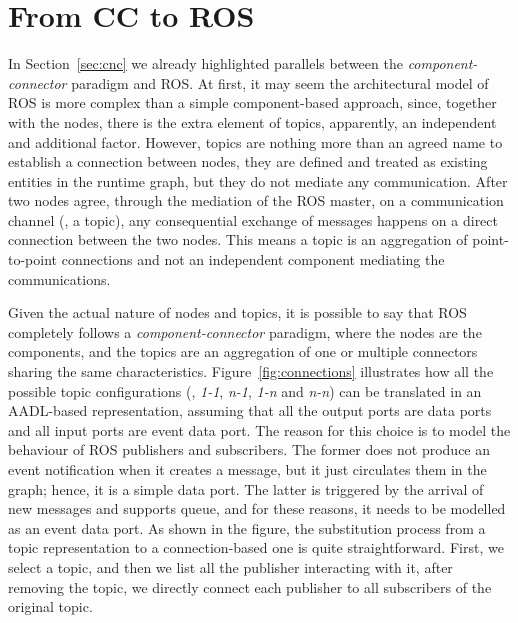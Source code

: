 \section{From CC to ROS}
\label{sec:cnc-ros}
In Section~\ref{sec:cnc} we already highlighted parallels between the \textit{com\-po\-nent-connector} paradigm and ROS. At first, it may seem the architectural model of ROS is more complex than a simple component-based approach, since, together with the nodes, there is the extra element of topics, apparently, an independent and additional factor. However, topics are nothing more than an agreed name to establish a connection between nodes, they are defined and treated as existing entities in the runtime graph, but they do not mediate any communication. After two nodes agree, through the mediation of the ROS master, on a communication channel (\ie, a topic), any consequential exchange of messages happens on a direct connection between the two nodes. This means a topic is an aggregation of point-to-point connections and not an independent component mediating the communications. 

Given the actual nature of nodes and topics, it is possible to say that ROS completely follows a \textit{component-connector} paradigm, where the nodes are the components, and the topics are an aggregation of one or multiple connectors sharing the same characteristics. Figure~\ref{fig:connections} illustrates how all the possible topic configurations (\ie, \textit{1-1}, \textit{n-1}, \textit{1-n} and \textit{n-n}) can be translated in an AADL-based representation, assuming that all the output ports are data ports and all input ports are event data port. The reason for this choice is to model the behaviour of ROS publishers and subscribers. The former does not produce an event notification when it creates a message, but it just circulates them in the graph; hence, it is a simple data port. The latter is triggered by the arrival of new messages and supports queue, and for these reasons, it needs to be modelled as an event data port. As shown in the figure, the substitution process from a topic representation to a connection-based one is quite straightforward. First, we select a topic, and then we list all the publisher interacting with it, after removing the topic, we directly connect each publisher to all subscribers of the original topic. 

